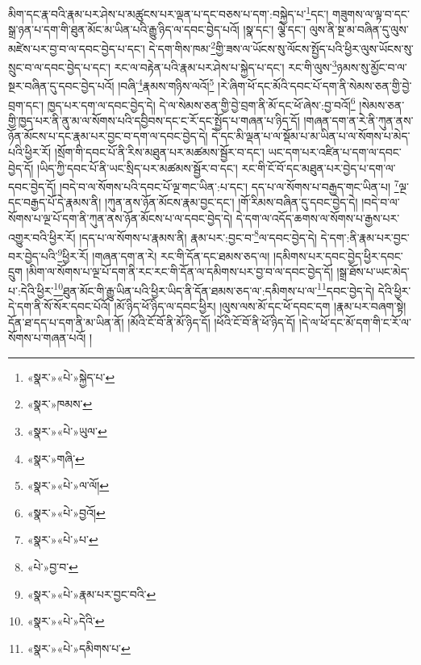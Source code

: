 མིག་དང་རྣ་བའི་རྣམ་པར་ཤེས་པ་མཚུངས་པར་ལྡན་པ་དང་བཅས་པ་དག་:བསྐྱེད་པ་\footnote{«སྣར་»«པེ་»སྐྱེད་པ་}དང་། གཟུགས་ལ་ལྟ་བ་དང་སྒྲ་ཉན་པ་དག་གི་ཐུན་མོང་མ་ཡིན་པའི་རྒྱུ་ཉིད་ལ་དབང་བྱེད་པའོ། །སྣ་དང་། ལྕེ་དང་། ལུས་ནི་སྔ་མ་བཞིན་དུ་ལུས་མཛེས་པར་བྱ་བ་ལ་དབང་བྱེད་པ་དང་། དེ་དག་གིས་ཁམ་\footnote{«སྣར་»ཁམས་}གྱི་ཟས་ལ་ཡོངས་སུ་ལོངས་སྤྱོད་པའི་ཕྱིར་ལུས་ཡོངས་སུ་སྲུང་བ་ལ་དབང་བྱེད་པ་དང་། རང་ལ་བརྟེན་པའི་རྣམ་པར་ཤེས་པ་སྐྱེད་པ་དང་། རང་གི་ལུས་\footnote{«སྣར་»«པེ་»ཡུལ་}ཉམས་སུ་མྱོང་བ་ལ་སྔར་བཞིན་དུ་དབང་བྱེད་པའོ། །བཞི་\footnote{«སྣར་»གཞི་}རྣམས་གཉིས་ལའོ།\footnote{«སྣར་»«པེ་»ལ་ལོ།} །རེ་ཞིག་ཕོ་དང་མོའི་དབང་པོ་དག་ནི་སེམས་ཅན་གྱི་བྱེ་བྲག་དང་། ཁྱད་པར་དག་ལ་དབང་བྱེད་དེ། དེ་ལ་སེམས་ཅན་གྱི་བྱེ་བྲག་ནི་མོ་དང་ཕོ་ཞེས་:བྱ་བའོ།\footnote{«སྣར་»«པེ་»བྱའོ།} །སེམས་ཅན་གྱི་ཁྱད་པར་ནི་ནུ་མ་ལ་སོགས་པའི་དབྱིབས་དང་ང་རོ་དང་སྤྱོད་པ་གཞན་པ་ཉིད་དོ། །གཞན་དག་ན་རེ་ནི་ཀུན་ནས་ཉོན་མོངས་པ་དང་རྣམ་པར་བྱང་བ་དག་ལ་དབང་བྱེད་དེ། དེ་དང་མི་ལྡན་པ་ལ་སྡོམ་པ་མ་ཡིན་པ་ལ་སོགས་པ་མེད་པའི་ཕྱིར་རོ། །སྲོག་གི་དབང་པོ་ནི་རིས་མཐུན་པར་མཚམས་སྦྱོར་བ་དང་། ཡང་དག་པར་འཛིན་པ་དག་ལ་དབང་བྱེད་དོ། །ཡིད་ཀྱི་དབང་པོ་ནི་ཡང་སྲིད་པར་མཚམས་སྦྱོར་བ་དང་། རང་གི་ངོ་བོ་དང་མཐུན་པར་བྱེད་པ་དག་ལ་དབང་བྱེད་དོ། །བདེ་བ་ལ་སོགས་པའི་དབང་པོ་ལྔ་གང་ཡིན་:པ་དང་། དད་པ་ལ་སོགས་པ་བརྒྱད་གང་ཡིན་པ། \footnote{«སྣར་»«པེ་»པ་}ལྔ་དང་བརྒྱད་པོ་དེ་རྣམས་ནི། །ཀུན་ནས་ཉོན་མོངས་རྣམ་བྱང་དང་། །གོ་རིམས་བཞིན་དུ་དབང་བྱེད་དེ། །བདེ་བ་ལ་སོགས་པ་ལྔ་པོ་དག་ནི་ཀུན་ནས་ཉོན་མོངས་པ་ལ་དབང་བྱེད་དེ། དེ་དག་ལ་འདོད་ཆགས་ལ་སོགས་པ་རྒྱས་པར་འགྱུར་བའི་ཕྱིར་རོ། །དད་པ་ལ་སོགས་པ་རྣམས་ནི། རྣམ་པར་:བྱང་བ་\footnote{«པེ་»བྱ་བ་}ལ་དབང་བྱེད་དེ། དེ་དག་:ནི་རྣམ་པར་བྱང་བར་བྱེད་པའི་\footnote{«སྣར་»«པེ་»རྣམ་པར་བྱང་བའི་}ཕྱིར་རོ། །གཞན་དག་ན་རེ། རང་གི་དོན་དང་ཐམས་ཅད་ལ། །དམིགས་པར་དབང་བྱེད་ཕྱིར་དབང་དྲུག །མིག་ལ་སོགས་པ་ལྔ་པོ་དག་ནི་རང་རང་གི་དོན་ལ་དམིགས་པར་བྱ་བ་ལ་དབང་བྱེད་དོ། །སྒྲ་ཐོས་པ་ཡང་མེད་པ་:དེའི་ཕྱིར་\footnote{«སྣར་»«པེ་»དེའི་}ཐུན་མོང་གི་རྒྱུ་ཡིན་པའི་ཕྱིར་ཡིད་ནི་དོན་ཐམས་ཅད་ལ་:དམིགས་པ་ལ་\footnote{«སྣར་»«པེ་»དམིགས་པ་}དབང་བྱེད་དེ། དེའི་ཕྱིར་དེ་དག་ནི་སོ་སོར་དབང་པོའོ། །མོ་ཉིད་ཕོ་ཉིད་ལ་དབང་ཕྱིར། །ལུས་ལས་མོ་དང་ཕོ་དབང་དག །རྣམ་པར་བཞག་སྟེ། དོན་ཐ་དད་པ་དག་ནི་མ་ཡིན་ནོ། །མོའི་ངོ་བོ་ནི་མོ་ཉིད་དོ། །ཕོའི་ངོ་བོ་ནི་ཕོ་ཉིད་དོ། །དེ་ལ་ཕོ་དང་མོ་དག་གི་ང་རོ་ལ་སོགས་པ་གཞན་པའོ། །
